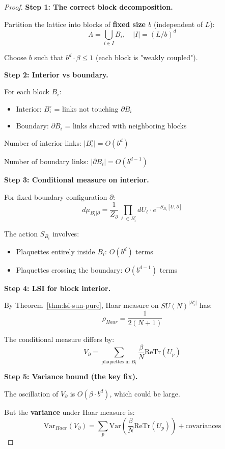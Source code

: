 \begin{proof}
\textbf{Step 1: The correct block decomposition.}

Partition the lattice into blocks of \textbf{fixed size $b$} (independent of $L$):
\[
\Lambda = \bigcup_{i \in I} B_i, \quad |I| = (L/b)^d
\]

Choose $b$ such that $b^d \cdot \beta \leq 1$ (each block is "weakly coupled").

\textbf{Step 2: Interior vs boundary.}

For each block $B_i$:
\begin{itemize}
\item Interior: $B_i^\circ$ = links not touching $\partial B_i$
\item Boundary: $\partial B_i$ = links shared with neighboring blocks
\end{itemize}

Number of interior links: $|B_i^\circ| = O(b^d)$

Number of boundary links: $|\partial B_i| = O(b^{d-1})$

\textbf{Step 3: Conditional measure on interior.}

For fixed boundary configuration $\partial$:
\[
d\mu_{B_i^\circ | \partial} = \frac{1}{Z_\partial} \prod_{\ell \in B_i^\circ} dU_\ell \cdot e^{-S_{B_i}[U, \partial]}
\]

The action $S_{B_i}$ involves:
\begin{itemize}
\item Plaquettes entirely inside $B_i$: $O(b^d)$ terms
\item Plaquettes crossing the boundary: $O(b^{d-1})$ terms
\end{itemize}

\textbf{Step 4: LSI for block interior.}

By Theorem~\ref{thm:lsi-sun-pure}, Haar measure on $SU(N)^{|B_i^\circ|}$ has:
\[
\rho_{Haar} = \frac{1}{2(N+1)}
\]

The conditional measure differs by:
\[
V_\partial = \sum_{\text{plaquettes in } B_i} \frac{\beta}{N} \mathrm{Re}\mathrm{Tr}(U_p)
\]

\textbf{Step 5: Variance bound (the key fix).}

The oscillation of $V_\partial$ is $O(\beta \cdot b^d)$, which could be large.

But the \textbf{variance} under Haar measure is:
\[
\mathrm{Var}_{Haar}(V_\partial) = \sum_p \mathrm{Var}\left(\frac{\beta}{N}\mathrm{Re}\mathrm{Tr}(U_p)\right) + \text{covariances}
\]


\end{proof}
